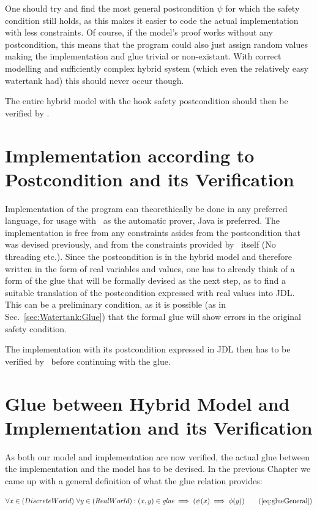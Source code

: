 One should try and find the most general postcondition \(\psi\) for which the safety condition still holds, as this makes it easier to code the actual implementation with less constraints. Of course, if the model's proof works without any postcondition, this means that the program could also just assign random values making the implementation and glue trivial or non-existant. With correct modelling and sufficiently complex hybrid system (which even the relatively easy watertank had) this should never occur though.

The entire hybrid model with the hook safety postcondition should then be verified by \keym.

\section{Implementation according to Postcondition and its Verification}
\label{sec:Process:Implementation}

Implementation of the program can theorethically be done in any preferred language, for usage with \key~as the automatic prover, Java is preferred. The implementation is free from any constraints asides from the postcondition that was devised previously, and from the constraints provided by \key~itself (No threading etc.). Since the postcondition is in the hybrid model and therefore written in the form of real variables and values, one has to already think of a form of the glue that will be formally devised as the next step, as to find a suitable translation of the postcondition expressed with real values into JDL. This can be a preliminary condition, as it is possible (as in Sec.~\ref{sec:Watertank:Glue}) that the formal glue will show errors in the original safety condition.

The implementation with its postcondition expressed in JDL then has to be verified by \key~before continuing with the glue. 

\section{Glue between Hybrid Model and Implementation and its Verification}
\label{sec:Process:Glue}

As both our model and implementation are now verified, the actual glue between the implementation and the model has to be devised. In the previous Chapter we came up with a general definition of what the glue relation provides:

\begin{equation}
	\centering
	\begin{split}
		\forall x \in (Discrete World)~\forall y \in (Real World):(x,y) \in \textit{glue} \implies (\psi(x) \implies \phi(y))
	\end{split}
	\tag{\ref{eq:glueGeneral}}
\end{equation}

